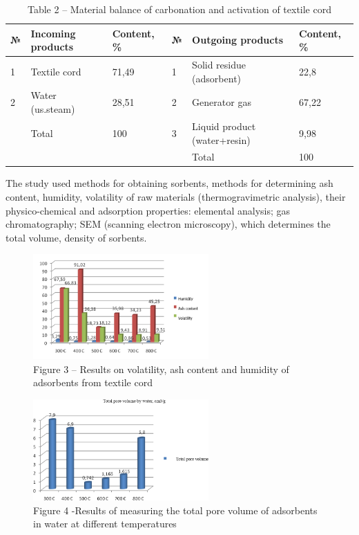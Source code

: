 \begin{table}[H]
\caption*{Table 2 -- Material balance of carbonation and activation of textile cord}
\centering
\begin{tabular}{|lll|l|l|l|}
\hline
\multicolumn{1}{|l|}{№} & \multicolumn{1}{l|}{Incoming products} & Content, \% & № & Outgoing products & Content, \% \\ \hline
\multicolumn{1}{|l|}{1} & \multicolumn{1}{l|}{Textile cord} & 71,49 & 1 & Solid residue (adsorbent) & 22,8 \\ \hline
\multicolumn{1}{|l|}{2} & \multicolumn{1}{l|}{Water (us.steam)} & 28,51 & 2 & Generator gas & 67,22 \\ \hline
\multicolumn{1}{|l|}{} & \multicolumn{1}{l|}{Total} & 100 & 3 & Liquid product (water+resin) & 9,98 \\ \hline
\multicolumn{3}{|l|}{} &  & Total & 100 \\ \hline
\end{tabular}%
\end{table}

\begin{multicols}{2}
The study used methods for obtaining sorbents, methods for determining
ash content, humidity, volatility of raw materials (thermogravimetric
analysis), their physico-chemical and adsorption properties: elemental
analysis; gas chromatography; SEM (scanning electron microscopy), which
determines the total volume, density of sorbents.
\end{multicols}

\begin{figure}[H]
	\centering
	\includegraphics[width=0.6\textwidth]{assets/1006}
	\caption*{Figure 3 -- Results on volatility, ash content and humidity of adsorbents from textile cord}
\end{figure}

\begin{figure}[H]
	\centering
	\includegraphics[width=0.6\textwidth]{assets/1007}
	\caption*{Figure 4 -Results of measuring the total pore volume of adsorbents in water at different temperatures}
\end{figure}

